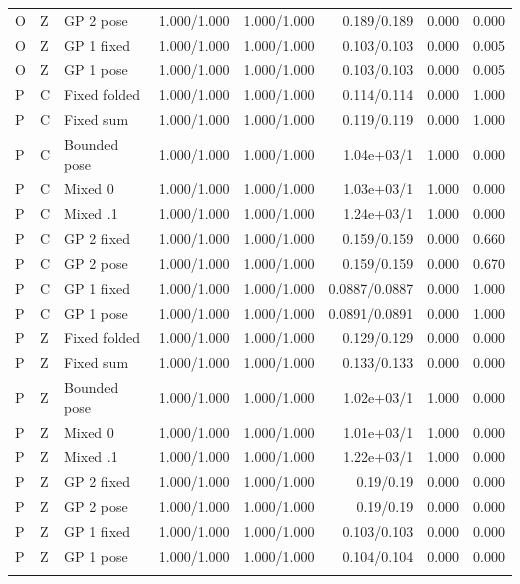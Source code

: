 \begin{table}[!t]
\begin{tabular}{lllrrrrr}
O & Z & GP 2 pose & 1.000/1.000 & 1.000/1.000 & 0.189/0.189 & 0.000 & 0.000 \\
O & Z & GP 1 fixed & 1.000/1.000 & 1.000/1.000 & 0.103/0.103 & 0.000 & 0.005 \\
O & Z & GP 1 pose & 1.000/1.000 & 1.000/1.000 & 0.103/0.103 & 0.000 & 0.005 \\
\addlinespace
P & C & Fixed folded & 1.000/1.000 & 1.000/1.000 & 0.114/0.114 & 0.000 & 1.000 \\
P & C & Fixed sum & 1.000/1.000 & 1.000/1.000 & 0.119/0.119 & 0.000 & 1.000 \\
P & C & Bounded pose & 1.000/1.000 & 1.000/1.000 & 1.04e+03/1 & 1.000 & 0.000 \\
P & C & Mixed 0 & 1.000/1.000 & 1.000/1.000 & 1.03e+03/1 & 1.000 & 0.000 \\
P & C & Mixed .1 & 1.000/1.000 & 1.000/1.000 & 1.24e+03/1 & 1.000 & 0.000 \\
P & C & GP 2 fixed & 1.000/1.000 & 1.000/1.000 & 0.159/0.159 & 0.000 & 0.660 \\
P & C & GP 2 pose & 1.000/1.000 & 1.000/1.000 & 0.159/0.159 & 0.000 & 0.670 \\
P & C & GP 1 fixed & 1.000/1.000 & 1.000/1.000 & 0.0887/0.0887 & 0.000 & 1.000 \\
P & C & GP 1 pose & 1.000/1.000 & 1.000/1.000 & 0.0891/0.0891 & 0.000 & 1.000 \\
\addlinespace
P & Z & Fixed folded & 1.000/1.000 & 1.000/1.000 & 0.129/0.129 & 0.000 & 0.000 \\
P & Z & Fixed sum & 1.000/1.000 & 1.000/1.000 & 0.133/0.133 & 0.000 & 0.000 \\
P & Z & Bounded pose & 1.000/1.000 & 1.000/1.000 & 1.02e+03/1 & 1.000 & 0.000 \\
P & Z & Mixed 0 & 1.000/1.000 & 1.000/1.000 & 1.01e+03/1 & 1.000 & 0.000 \\
P & Z & Mixed .1 & 1.000/1.000 & 1.000/1.000 & 1.22e+03/1 & 1.000 & 0.000 \\
P & Z & GP 2 fixed & 1.000/1.000 & 1.000/1.000 & 0.19/0.19 & 0.000 & 0.000 \\
P & Z & GP 2 pose & 1.000/1.000 & 1.000/1.000 & 0.19/0.19 & 0.000 & 0.000 \\
P & Z & GP 1 fixed & 1.000/1.000 & 1.000/1.000 & 0.103/0.103 & 0.000 & 0.000 \\
P & Z & GP 1 pose & 1.000/1.000 & 1.000/1.000 & 0.104/0.104 & 0.000 & 0.000 \\
\addlinespace
\bottomrule
\end{tabular}
\end{table}
